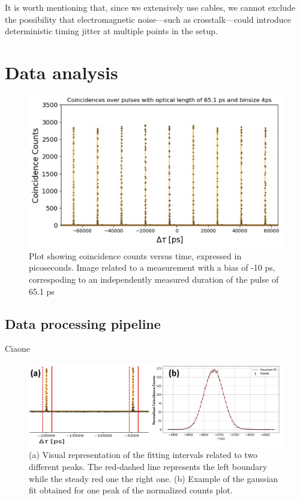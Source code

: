 It is worth mentioning that, since we extensively use cables, we cannot exclude the possibility that electromagnetic noise—such as crosstalk—could introduce deterministic timing jitter at multiple points in the setup.

\section{Data analysis}
\label{sec:DataAnalysis}

\begin{figure}[hbtp]
\centering
\includegraphics[width=1\textwidth]{CoincidenceExample.jpg}
\caption{Plot showing coincidence counts versus time, expressed in picoseconds. Image related to a measurement with a bias of -10 ps, correspoding to an independently measured duration of the pulse of 65.1 ps}
\label{CoincidenceCounts}
\end{figure}



\subsection{Data processing pipeline}
\label{subsec:Pipeline}
Ciaone

\begin{figure}[hbtp]
\centering
\includegraphics[width=1\textwidth]{NCountsFitting.jpg}
\caption{(a) Visual representation of the fitting intervals related to two different peaks. The red-dashed line represents the left boundary while the steady red one the right one. (b) Example of the gaussian fit obtained for one peak of the normalized counts plot.}
\label{FittingIMG}
\end{figure}


